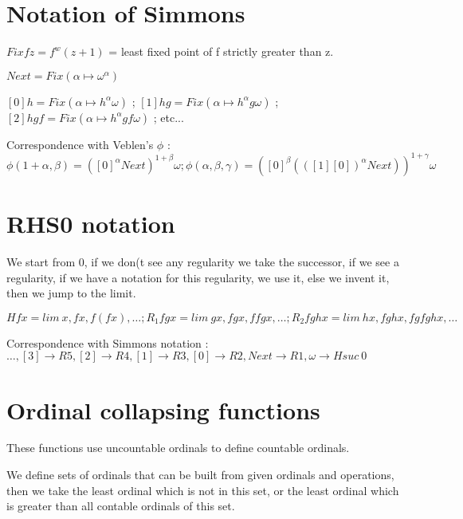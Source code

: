 \documentclass[8pt]{article}
\begin{document}
\section{Notation of Simmons}
\vspace{-0.4cm}
\( Fix f z = f^w(z+1)\) = least fixed point of f strictly greater than z.

\( Next = Fix (\alpha \mapsto \omega^\alpha) \) 

\( [0] h = Fix (\alpha \mapsto h^\alpha \omega) \) ;
\( [1] h g = Fix (\alpha \mapsto h^\alpha g \omega) \) ;
\( [2] h g f = Fix (\alpha \mapsto h^\alpha g f \omega) \) ; etc...

Correspondence with Veblen's \(\phi\) : \( \phi(1+\alpha,\beta) = ([0]^\alpha Next)^{1+\beta} \omega ; 
 \phi(\alpha,\beta,\gamma) = ([0]^\beta (([1] [0])^\alpha Next))^{1+\gamma} \omega \)


\vspace{-0.6cm}

\section{RHS0 notation}
\vspace{-0.4cm}
We start from 0, if we don(t see any regularity we take the successor, if we see a regularity, if we have a notation for this regularity, we use it, else we invent it, then we jump to the limit.

\( H f x = lim\ x, f x, f (f x), \ldots ; R_1 f g x = lim\ g x, f g x, f f g x, \ldots ; R_2 f g h x = lim\ h x, f g h x, f g f g h x, \ldots \)

Correspondence with Simmons notation : 
\( \ldots, [3] \rightarrow R5, [2] \rightarrow R4, [1] \rightarrow R3, [0] \rightarrow R2, Next \rightarrow R1, \omega \rightarrow H suc\ 0 \)

\vspace{-0.6cm}

\section{Ordinal collapsing functions}
\vspace{-0.4cm}
These functions use uncountable ordinals to define countable ordinals.

We define sets of ordinals that can be built from given ordinals and operations, then we take the least ordinal which is not in this set, or the least ordinal which is greater than all contable ordinals of this set.
\end{document}
